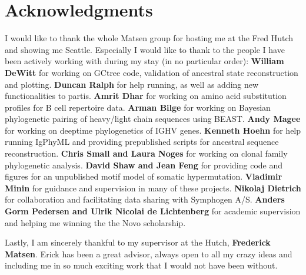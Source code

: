 % 

\cleardoublepage

\section*{Acknowledgments}
I would like to thank the whole Matsen group for hosting me at the Fred Hutch and showing me Seattle.
Especially I would like to thank to the people I have been actively working with during my stay (in no particular order):
\textbf{William DeWitt} for working on GCtree code, validation of ancestral state reconstruction and plotting.
\textbf{Duncan Ralph} for help running, as well as adding new functionalities to partis.
\textbf{Amrit Dhar} for working on amino acid substitution profiles for B cell repertoire data.
\textbf{Arman Bilge} for working on Bayesian phylogenetic pairing of heavy/light chain sequences using BEAST.
\textbf{Andy Magee} for working on deeptime phylogenetics of IGHV genes.
\textbf{Kenneth Hoehn} for help running IgPhyML and providing prepublished scripts for ancestral sequence reconstruction.
\textbf{Chris Small and Laura Noges} for working on clonal family phylogenetic analysis.
\textbf{David Shaw and Jean Feng} for providing code and figures for an unpublished motif model of somatic hypermutation.
\textbf{Vladimir Minin} for guidance and supervision in many of these projects.
\textbf{Nikolaj Dietrich} for collaboration and facilitating data sharing with Symphogen A/S.
\textbf{Anders Gorm Pedersen and Ulrik Nicolai de Lichtenberg} for academic supervision and helping me winning the the Novo scholarship.

Lastly, I am sincerely thankful to my supervisor at the Hutch, \textbf{Frederick Matsen}.
Erick has been a great advisor, always open to all my crazy ideas and including me in so much exciting work that I would not have been without.


